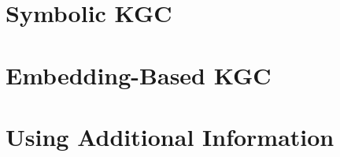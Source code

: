 \section{Symbolic KGC}
\label{sec:3_related_work/1_symbolic}



\section{Embedding-Based KGC}
\label{sec:3_related_work/2_embedding_based}



\section{Using Additional Information}
\label{sec:3_related_work/3_additional_information}

